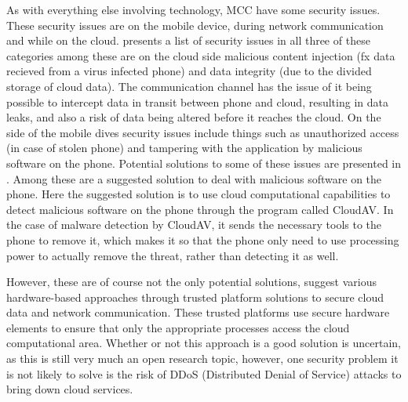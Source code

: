 As with everything else involving technology, MCC have some security issues.
These security issues are on the mobile device, during network communication and while on the cloud.
\citet{6923101} presents a list of security issues in all three of these categories among these are on the cloud side malicious content injection (fx data recieved from a virus infected phone) and data integrity (due to the divided storage of cloud data).
The communication channel has the issue of it being possible to intercept data in transit between phone and cloud, resulting in data leaks, and also a risk of data being altered before it reaches the cloud.
On the side of the mobile dives security issues include things such as unauthorized access (in case of stolen phone) and tampering with the application by malicious software on the phone.
Potential solutions to some of these issues are presented in \citet{6583635}.
Among these are a suggested solution to deal with malicious software on the phone.
Here the suggested solution is to use cloud computational capabilities to detect malicious software on the phone through the program called CloudAV.
In the case of malware detection by CloudAV, it sends the necessary tools to the phone to remove it, which makes it so that the phone only need to use processing power to actually remove the threat, rather than detecting it as well.

However, these are of course not the only potential solutions, \citet{7056876} suggest various hardware-based approaches through trusted platform solutions to secure cloud data and network communication.
These trusted platforms use secure hardware elements to ensure that only the appropriate processes access the cloud computational area.
Whether or not this approach is a good solution is uncertain, as this is still very much an open research topic, however, one security problem it is not likely to solve is the risk of DDoS (Distributed Denial of Service) attacks to bring down cloud services.
